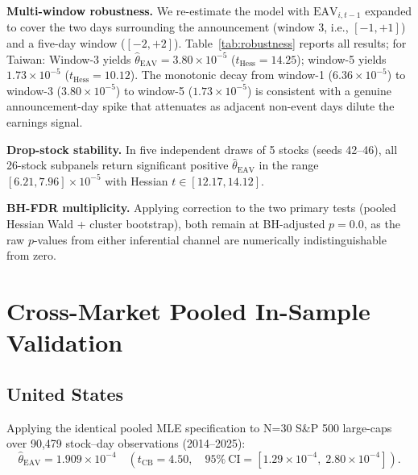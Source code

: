 \documentclass[12pt,a4paper]{article}
\begin{document}
\textbf{Multi-window robustness.} We re-estimate the model with
$\mathrm{EAV}_{i,t-1}$ expanded to cover the two days surrounding the
announcement (window 3, i.e., $[-1,+1]$) and a five-day window
($[-2,+2]$). Table~\ref{tab:robustness} reports all results; for Taiwan:
Window-3 yields $\hat{\theta}_{\mathrm{EAV}} = 3.80 \times 10^{-5}$
($t_{\mathrm{Hess}} = 14.25$); window-5 yields $1.73 \times 10^{-5}$
($t_{\mathrm{Hess}} = 10.12$).
The monotonic decay from window-1 ($6.36 \times 10^{-5}$) to window-3
($3.80 \times 10^{-5}$) to window-5 ($1.73 \times 10^{-5}$) is
consistent with a genuine announcement-day spike that attenuates as
adjacent non-event days dilute the earnings signal.

\textbf{Drop-stock stability.} In five independent draws of 5 stocks
(seeds 42--46), all 26-stock subpanels return significant positive
$\hat{\theta}_{\mathrm{EAV}}$ in the range $[6.21, 7.96] \times 10^{-5}$
with Hessian $t \in [12.17, 14.12]$.

\textbf{BH-FDR multiplicity.} Applying \citet{benjamini_hochberg1995} correction to
the two primary tests (pooled Hessian Wald + cluster bootstrap), both
remain at BH-adjusted $p = 0.0$, as the raw $p$-values from either
inferential channel are numerically indistinguishable from zero.

\section{Cross-Market Pooled In-Sample Validation}
\label{sec:cross}

\subsection{United States}

Applying the identical pooled MLE specification to N=30 S\&P 500
large-caps over 90,479 stock--day observations (2014--2025):
%
\[
\hat{\theta}_{\mathrm{EAV}} = 1.909 \times 10^{-4}
\quad (t_{\mathrm{CB}} = 4.50,\quad
 95\%\ \mathrm{CI} = [1.29 \times 10^{-4},\; 2.80 \times 10^{-4}]).
\]
\end{document}
